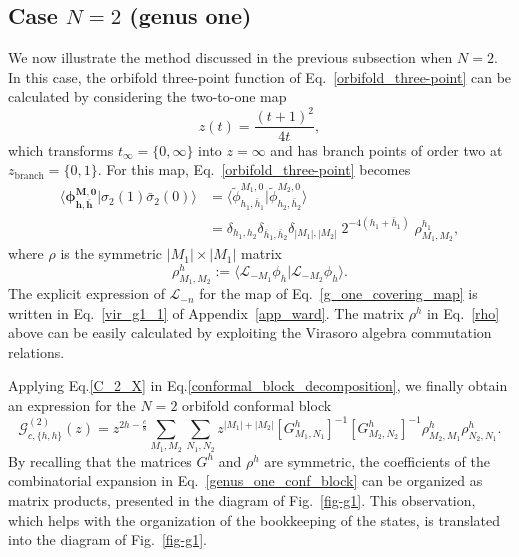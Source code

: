 \documentclass[a4paper,11pt]{article}
\begin{document}
\subsection{Case $N=2$ (genus one)}\label{sec:genus_one}

We now illustrate the method discussed in the previous subsection when $N=2$. 
In this case, the orbifold three-point function of Eq.~\eqref{orbifold_three-point} 
can be calculated by considering the two-to-one map
\begin{equation}\label{g_one_covering_map}
 z(t)=\frac{(t+1)^2}{4t},
\end{equation}
which transforms $t_{\infty}=\{0,\infty\}$ into $z=\infty$ and has branch points of 
order two at $z_{\text{branch}}=\{0, 1\}$. For this map, Eq.~\eqref{orbifold_three-point} becomes
\begin{align}\label{C_2_X}
 \langle \boldsymbol{\phi}^{\boldsymbol{M},\boldsymbol{0}}_{\boldsymbol{h}, \boldsymbol{\bar{h}}}| 
 \sigma_{2}(1)\bar{\sigma}_{2}(0)\rangle&=\langle \tilde{\phi}_{h_1, \bar{h}_1}^{M_1,0} | \tilde{\phi}_{h_2, \bar{h}_2}^{M_2, 0}\rangle \nonumber\\
 &=\delta_{h_1, h_2}\delta_{\bar{h}_1, \bar{h}_2}\delta_{|M_1|,|M_2|}\;2^{-4(h_1+\bar{h}_1)} \;\rho^{h_1}_{M_1,M_2},
\end{align}
where $\rho$ is the symmetric $|M_1|\times|M_1|$ matrix
\begin{equation}
\label{rho}
 \rho^h_{M_1,M_2}:=\langle \mathcal{L}_{-M_1}\phi_{h}|\mathcal{L}_{-M_2}\phi_{h}\rangle.
\end{equation}
The explicit expression of $\mathcal{L}_{-n}$ for the map of Eq.~\eqref{g_one_covering_map}
is written in Eq.~\eqref{vir_g1_1} of Appendix~\ref{app_ward}. The matrix $\rho^h$ in Eq.~\eqref{rho} 
above can be easily calculated by exploiting the Virasoro algebra commutation relations.

Applying Eq.\eqref{C_2_X} in Eq.\eqref{conformal_block_decomposition}, we finally obtain an 
expression for the $N=2$ orbifold conformal block
\begin{equation}\label{genus_one_conf_block}
 \mathcal{G}_{c, \{h,h\}}^{(2)}(z)=z^{2h-\frac{c}{8}}\sum_{M_1, M_2}\sum_{N_1, N_2}
 z^{|M_1|+|M_2|}[G^{h}_{M_1,N_1}]^{-1}[G^{h}_{ M_2,N_2}]^{-1}
 \rho^h_{M_2,M_1}\rho^h_{N_2,N_1}.
\end{equation}
By recalling that the matrices $G^h$ and $\rho^h$ are symmetric, the coefficients of the combinatorial 
expansion in Eq.~\eqref{genus_one_conf_block} can be organized as matrix products, presented in the diagram 
of Fig.~\ref{fig-g1}. This observation, which helps with the organization of the bookkeeping of the states, 
is translated into the diagram of Fig.~\ref{fig-g1}.
\end{document}
